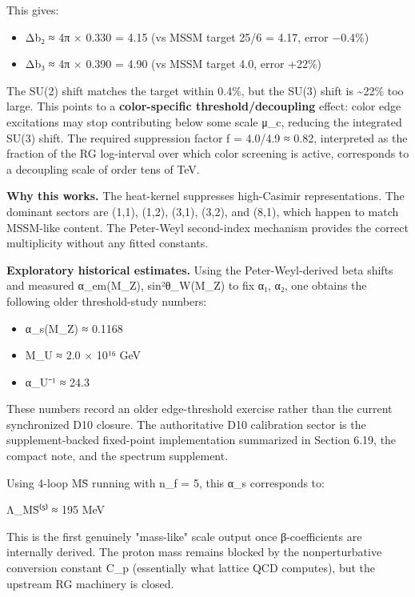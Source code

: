 This gives:

\begin{itemize}
\tightlist
\item
  Δb₂ ≈ 4π × 0.330 = 4.15 (vs MSSM target 25/6 = 4.17, error −0.4\%)
\item
  Δb₃ ≈ 4π × 0.390 = 4.90 (vs MSSM target 4.0, error +22\%)
\end{itemize}

The SU(2) shift matches the target within 0.4\%, but the SU(3) shift is \textasciitilde22\% too large. This points to a \textbf{color-specific threshold/decoupling} effect: color edge excitations may stop contributing below some scale μ\_c, reducing the integrated SU(3) shift. The required suppression factor f = 4.0/4.9 ≈ 0.82, interpreted as the fraction of the RG log-interval over which color screening is active, corresponds to a decoupling scale of order tens of TeV.

\textbf{Why this works.} The heat-kernel suppresses high-Casimir representations. The dominant sectors are (1,1), (1,2), (3,1), (3,2), and (8,1), which happen to match MSSM-like content. The Peter-Weyl second-index mechanism provides the correct multiplicity without any fitted constants.

\textbf{Exploratory historical estimates.} Using the Peter-Weyl-derived beta shifts and measured α\_em(M\_Z), sin²θ\_W(M\_Z) to fix α₁, α₂, one obtains the following older threshold-study numbers:

\begin{itemize}
\tightlist
\item
  α\_s(M\_Z) ≈ 0.1168
\item
  M\_U ≈ 2.0 × 10¹⁶ GeV
\item
  α\_U⁻¹ ≈ 24.3
\end{itemize}

These numbers record an older edge-threshold exercise rather than the current synchronized D10 closure. The authoritative D10 calibration sector is the supplement-backed fixed-point implementation summarized in Section 6.19, the compact note, and the spectrum supplement.

Using 4-loop M\={S} running with n\_f = 5, this α\_s corresponds to:

Λ\_M\={S}⁽⁵⁾ ≈ 195 MeV

This is the first genuinely "mass-like" scale output once β-coefficients are internally derived. The proton mass remains blocked by the nonperturbative conversion constant C\_p (essentially what lattice QCD computes), but the upstream RG machinery is closed.

